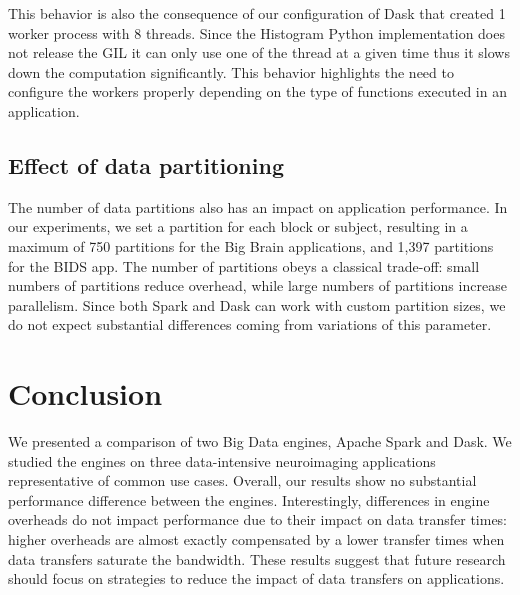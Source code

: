 \documentclass[conference]{IEEEtran}
\begin{document}
This behavior is also the consequence of our configuration of Dask that
created 1 worker process with 8 threads. Since the Histogram Python
implementation does not release the GIL it can only use one of the thread
at a given time thus it slows down the computation significantly. This
behavior highlights the need to configure the workers properly depending on
the type of functions executed in an application.

\subsection{Effect of data partitioning}

The number of data partitions also has an impact on application
performance. In our experiments, we set a partition for each block or
subject, resulting in a maximum of 750 partitions for the Big Brain
applications, and 1,397 partitions for the BIDS app. The number of
partitions obeys a classical trade-off: small numbers of partitions reduce 
overhead, while large numbers of
partitions increase parallelism. Since both Spark and Dask can
work with custom partition sizes, we do not expect substantial differences
coming from variations of this parameter.


\section{Conclusion}
We presented a comparison of two Big Data engines, Apache Spark and Dask.
We studied the engines on three data-intensive neuroimaging applications
representative of common use cases. Overall, our results show no substantial
performance difference between the engines. Interestingly, differences in
engine overheads do not impact performance due to their impact on data
transfer times: higher overheads are almost exactly compensated by a lower
transfer times when data transfers saturate the bandwidth. These results
suggest that future research should focus on strategies to reduce the
impact of data transfers on applications.
\end{document}
